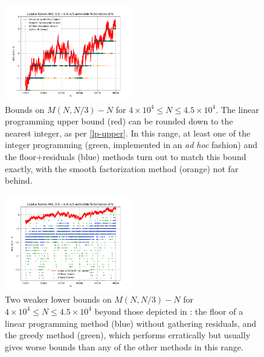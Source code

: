 \documentclass[12pt,a4paper,reqno]{amsart}
\numberwithin{equation}{section}
\theoremstyle{plain}
\theoremstyle{definition}
\begin{document}
    \begin{figure}
      \centering
      \includegraphics[width=0.5\textwidth]{surplus.png}
      \caption{Bounds on $M(N,N/3)-N$ for $4 \times 10^4 \leq N \leq 4.5 \times 10^4$.  The linear programming upper bound (red) can be rounded down to the nearest integer, as per \eqref{lp-upper}.  In this range, at least one of the integer programming (green, implemented in an \emph{ad hoc} fashion) and the floor+residuals (blue) methods turn out to match this bound exactly, with the smooth factorization method (orange) not far behind.}
      \label{fig-surplus}
      \end{figure}

      \begin{figure}
        \centering
        \includegraphics[width=0.5\textwidth]{surplus2.png}
        \caption{Two weaker lower bounds on $M(N,N/3)-N$ for $4 \times 10^4 \leq N \leq 4.5 \times 10^4$ beyond those depicted in : the floor of a linear programming method (blue) without gathering residuals, and the greedy method (green), which performs erratically but usually gives worse bounds than any of the other methods in this range.}
        \label{fig-surplus2}
        \end{figure}
  
\end{document}
